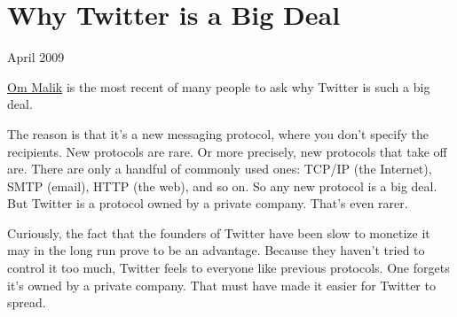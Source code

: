 \chapter{Why Twitter is a Big Deal}


            
              
                

April 2009

\href{http://gigaom.com/2009/04/03/google-may-buy-twitter-or-not-but-why-is-twitter-so-hot/}{Om Malik}
                  is the most recent of many people to ask why Twitter is such a
                  big deal.

The reason is that it's a new messaging
                  protocol, where you don't specify the recipients. New
                  protocols are rare. Or more precisely, new protocols that take
                  off are. There are only a handful of commonly used ones:
                  TCP/IP (the Internet), SMTP (email), HTTP (the web), and so
                  on. So any new protocol is a big deal. But Twitter is a
                  protocol owned by a private company. That's even rarer.

Curiously,
                  the fact that the founders of Twitter have been slow to
                  monetize it may in the long run prove to be an advantage.
                  Because they haven't tried to control it too much, Twitter
                  feels to everyone like previous protocols. One forgets it's
                  owned by a private company. That must have made it easier for
                  Twitter to spread.


              
            
          
            
              
                


                  
              
            
          
